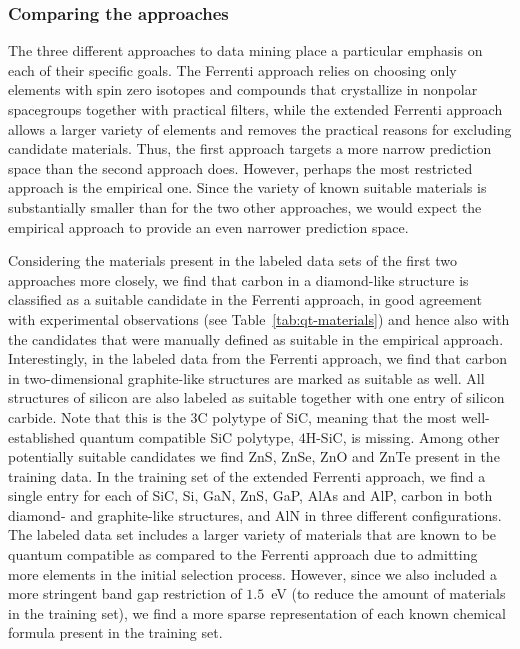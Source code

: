 \documentclass[superscriptaddress,unsortedaddress,
 amsmath,amssymb,
 aps,
]{revtex4-2}
\begin{document}
\subsubsection*{Comparing the approaches}
The three different approaches to data mining place a particular emphasis on each of their specific goals. The Ferrenti approach relies on choosing only elements with spin zero isotopes and compounds that crystallize in nonpolar spacegroups together with practical filters, while the extended Ferrenti approach allows a larger variety of elements and removes the practical reasons for excluding candidate materials. Thus, the first approach targets a more narrow prediction space than the second approach does. However, perhaps the most restricted approach is the empirical one. Since the variety of known suitable materials is substantially smaller than for the two other approaches, we would expect the empirical approach to provide an even narrower prediction space. %

Considering the materials present in the labeled data sets of the first two approaches more closely, we find that carbon in a diamond-like structure is classified as a suitable candidate in the Ferrenti approach, in good agreement with experimental observations (see Table~\ref{tab:qt-materials}) and hence also with the candidates that were manually defined as suitable in the empirical approach.   Interestingly, in the labeled data from the Ferrenti approach, we find that carbon in two-dimensional graphite-like structures are marked as suitable as well. All structures of silicon are also labeled as suitable together with one entry of silicon carbide. Note that this is the $3$C polytype of SiC, meaning that the most well-established quantum compatible SiC polytype, $4$H-SiC, is missing. 
Among other potentially suitable candidates we find ZnS, ZnSe, ZnO and ZnTe present in the training data.  
In the training set of the extended Ferrenti approach, we find a single entry for each of SiC, Si, GaN, ZnS, GaP, AlAs and AlP, carbon in both diamond- and graphite-like structures, and AlN in three different configurations. The labeled data set includes a larger variety of materials that are known to be quantum compatible as compared to the Ferrenti approach due to admitting more elements in the initial selection process. However, since we also included a more stringent band gap restriction of $1.5$~eV (to reduce the amount of materials in the training set), we find a more sparse representation of each known chemical formula present in the training set. 
\end{document}
